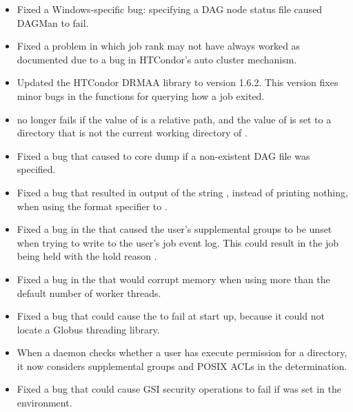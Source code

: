 \begin{itemize}
\item Fixed a Windows-specific bug:  specifying a DAG node status file
caused DAGMan to fail.

\item Fixed a problem in which job rank may not have always worked
as documented due to a bug in HTCondor's auto cluster mechanism.

\item Updated the HTCondor DRMAA library to version 1.6.2. 
This version fixes minor bugs in the functions for querying how a job exited.

\item {} no longer fails if the value of
 is a relative path, 
and the value of  is set to a directory 
that is not the current working directory of .

\item Fixed a bug that caused  to core dump if
a non-existent DAG file was specified.

\item Fixed a bug that resulted in output of the string , 
instead of printing nothing,
when using the  format specifier to
 .

\item Fixed a bug in the  that caused the user's supplemental
groups to be unset when trying to write to the user's job event log.
This could result in the job being held with the hold reason
.

\item Fixed a bug in the  that would corrupt memory when
using more than the default number of worker threads.

\item Fixed a bug that could cause the  to fail at
start up, because it could not locate a Globus threading library.

\item When a daemon checks whether a user has execute permission for a
directory, it now considers supplemental groups and POSIX ACLs in the
determination.

\item Fixed a bug that could cause GSI security operations to fail if
 was set in the environment.


\end{itemize}
